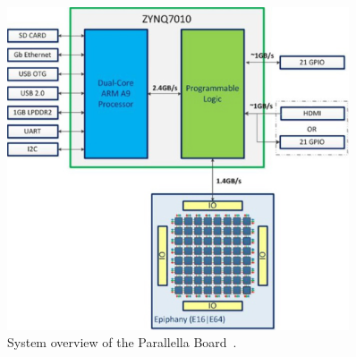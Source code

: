 \documentclass[american, hauptseminar, twoside]{zihpub}
\begin{document}
				\begin{figure}[H]
					\begin{center}
						\includegraphics[width=0.9\textwidth]{grafiken/sysoverview.pdf}
						\caption{System overview of the Parallella Board~\cite{Adaptev2015a}.}
						\label{fig:sysoverview}
					\end{center}
				\end{figure}
\end{document}
